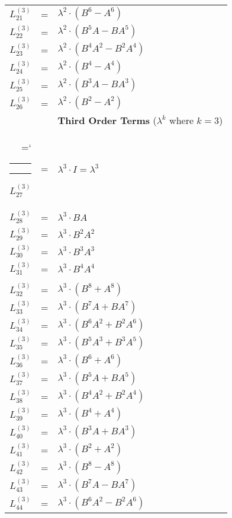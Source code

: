 \documentclass{article}
\makeatletter
\def\nobreakhline{%
  \noalign{\ifnum0=`}\fi
    \penalty\@M
    \futurelet\@let@token\LT@@nobreakhline}
\def\LT@@nobreakhline{%
  \ifx\@let@token\hline
    \global\let\@gtempa\@gobble
    \gdef\LT@sep{\penalty\@M\vskip\doublerulesep}%
  \else
    \global\let\@gtempa\@empty
    \gdef\LT@sep{\penalty\@M\vskip-\arrayrulewidth}%
  \fi
  \ifnum0=`{\fi}%
  \multispan\LT@cols
     \unskip\leaders\hrule\@height\arrayrulewidth\hfill\cr
  \noalign{\LT@sep}%
  \multispan\LT@cols
     \unskip\leaders\hrule\@height\arrayrulewidth\hfill\cr
  \noalign{\penalty\@M}%
  \@gtempa}
\makeatother
\begin{document}
\begin{center}
\begin{longtable}{rcl}
$L_{21}^{(3)}$ & = & ${\lambda}^{2}{\cdot}(B^{6}-A^{6})$ \\*
$L_{22}^{(3)}$ & = & ${\lambda}^{2}{\cdot}(B^{5}A-BA^{5})$ \\*
$L_{23}^{(3)}$ & = & ${\lambda}^{2}{\cdot}(B^{4}A^{2}-B^{2}A^{4})$ \\*
$L_{24}^{(3)}$ & = & ${\lambda}^{2}{\cdot}(B^{4}-A^{4})$ \\*
$L_{25}^{(3)}$ & = & ${\lambda}^{2}{\cdot}(B^{3}A-BA^{3})$ \\*
$L_{26}^{(3)}$ & = & ${\lambda}^{2}{\cdot}(B^{2}-A^{2})$ \\
               &   & \textbf{Third Order Terms} ($\lambda^{k}$ where $k=3$) \\*
\nobreakhline         
$L_{27}^{(3)}$ & = & ${\lambda}^{3}{\cdot}I = {\lambda}^{3}$ \\*
$L_{28}^{(3)}$ & = & ${\lambda}^{3}{\cdot}BA$ \\*
$L_{29}^{(3)}$ & = & ${\lambda}^{3}{\cdot}B^{2}A^{2}$ \\*
$L_{30}^{(3)}$ & = & ${\lambda}^{3}{\cdot}B^{3}A^{3}$ \\*
$L_{31}^{(3)}$ & = & ${\lambda}^{3}{\cdot}B^{4}A^{4}$ \\*
               &   & \\*
$L_{32}^{(3)}$ & = & ${\lambda}^{3}{\cdot}(B^{8}+A^{8})$ \\*
$L_{33}^{(3)}$ & = & ${\lambda}^{3}{\cdot}(B^{7}A+BA^{7})$ \\*
$L_{34}^{(3)}$ & = & ${\lambda}^{3}{\cdot}(B^{6}A^{2}+B^{2}A^{6})$ \\*
$L_{35}^{(3)}$ & = & ${\lambda}^{3}{\cdot}(B^{5}A^{3}+B^{3}A^{5})$ \\*
$L_{36}^{(3)}$ & = & ${\lambda}^{3}{\cdot}(B^{6}+A^{6})$ \\*
$L_{37}^{(3)}$ & = & ${\lambda}^{3}{\cdot}(B^{5}A+BA^{5})$ \\*
$L_{38}^{(3)}$ & = & ${\lambda}^{3}{\cdot}(B^{4}A^{2}+B^{2}A^{4})$ \\*
$L_{39}^{(3)}$ & = & ${\lambda}^{3}{\cdot}(B^{4}+A^{4})$ \\*
$L_{40}^{(3)}$ & = & ${\lambda}^{3}{\cdot}(B^{3}A+BA^{3})$ \\*
$L_{41}^{(3)}$ & = & ${\lambda}^{3}{\cdot}(B^{2}+A^{2})$ \\*
$L_{42}^{(3)}$ & = & ${\lambda}^{3}{\cdot}(B^{8}-A^{8})$ \\*
$L_{43}^{(3)}$ & = & ${\lambda}^{3}{\cdot}(B^{7}A-BA^{7})$ \\*
$L_{44}^{(3)}$ & = & ${\lambda}^{3}{\cdot}(B^{6}A^{2}-B^{2}A^{6})$ \\*

\end{longtable}
\end{center}
\end{document}
